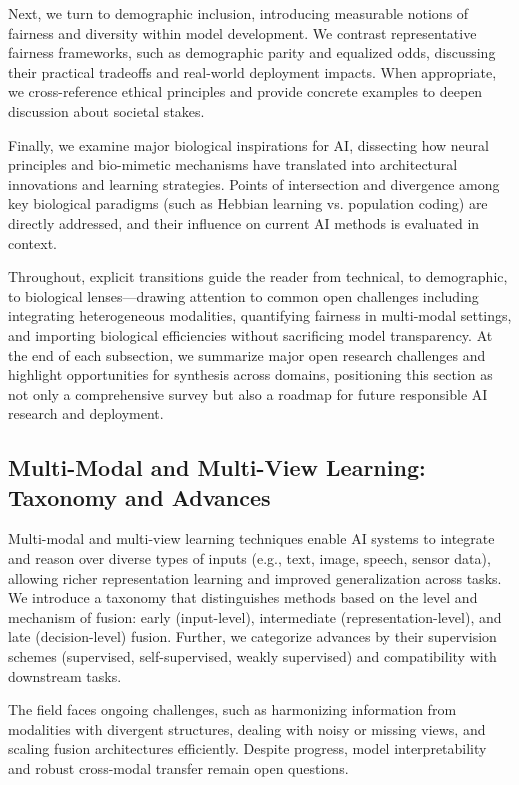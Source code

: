 \documentclass[sigconf]{acmart}
\begin{document}
Next, we turn to demographic inclusion, introducing measurable notions of fairness and diversity within model development. We contrast representative fairness frameworks, such as demographic parity and equalized odds, discussing their practical tradeoffs and real-world deployment impacts. When appropriate, we cross-reference ethical principles and provide concrete examples to deepen discussion about societal stakes.

Finally, we examine major biological inspirations for AI, dissecting how neural principles and bio-mimetic mechanisms have translated into architectural innovations and learning strategies. Points of intersection and divergence among key biological paradigms (such as Hebbian learning vs. population coding) are directly addressed, and their influence on current AI methods is evaluated in context.

Throughout, explicit transitions guide the reader from technical, to demographic, to biological lenses—drawing attention to common open challenges including integrating heterogeneous modalities, quantifying fairness in multi-modal settings, and importing biological efficiencies without sacrificing model transparency. At the end of each subsection, we summarize major open research challenges and highlight opportunities for synthesis across domains, positioning this section as not only a comprehensive survey but also a roadmap for future responsible AI research and deployment.

\subsection{Multi-Modal and Multi-View Learning: Taxonomy and Advances}

Multi-modal and multi-view learning techniques enable AI systems to integrate and reason over diverse types of inputs (e.g., text, image, speech, sensor data), allowing richer representation learning and improved generalization across tasks. We introduce a taxonomy that distinguishes methods based on the level and mechanism of fusion: early (input-level), intermediate (representation-level), and late (decision-level) fusion. Further, we categorize advances by their supervision schemes (supervised, self-supervised, weakly supervised) and compatibility with downstream tasks.

The field faces ongoing challenges, such as harmonizing information from modalities with divergent structures, dealing with noisy or missing views, and scaling fusion architectures efficiently. Despite progress, model interpretability and robust cross-modal transfer remain open questions.
\end{document}
